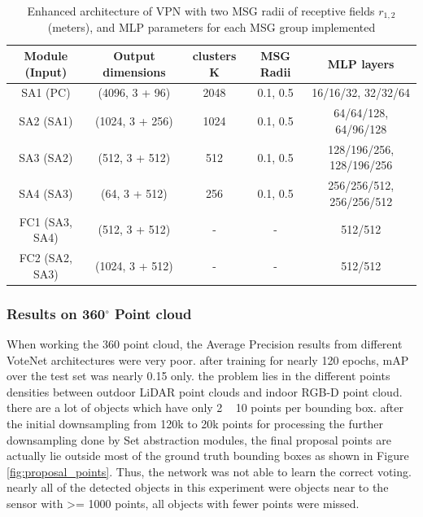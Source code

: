 \documentclass[10pt,twocolumn,letterpaper]{article}
\begin{document}
\begin{table}
\label{tab:votenet_msg}
\begin{center}
\begin{tabular}{|c|c|c|c|c|}
\hline
Module (Input) & Output dimensions & clusters K & MSG Radii & MLP layers \\
\hline\hline
SA1 (PC) & (4096, 3 + 96) & 2048 & 0.1,  0.5 & 16/16/32, 32/32/64 \\
SA2 (SA1) & (1024, 3 + 256) & 1024 & 0.1,  0.5 & 64/64/128,  64/96/128 \\
SA3 (SA2) & (512, 3 + 512) & 512 & 0.1,  0.5 & 128/196/256,  128/196/256 \\
SA4 (SA3) & (64, 3 + 512) & 256 & 0.1,  0.5 & 256/256/512,  256/256/512 \\
FC1 (SA3, SA4) & (512, 3 + 512) & - & - & 512/512 \\
FC2 (SA2, SA3) & (1024, 3 + 512) & - & - & 512/512 \\
\hline
\end{tabular}
\end{center}
\caption{Enhanced architecture of VPN with two MSG radii of receptive fields $r_{1,2}$ (meters), and MLP parameters for each MSG group implemented \cite{shi2019pointrcnn}}
\end{table}

\subsubsection{Results on 360$^{\circ}$ Point cloud}
When working the 360 point cloud, the Average Precision results from different VoteNet architectures were very poor. after training for nearly 120 epochs, mAP over the test set was nearly 0.15 only. the problem lies in the different points densities between outdoor LiDAR point clouds and  indoor RGB-D point cloud. there are a lot of objects which have only 2 ~ 10 points per bounding box. after the initial downsampling from 120k to 20k points for processing the further downsampling done by Set abstraction modules, the final proposal points are actually lie outside most of the ground truth bounding boxes as shown in Figure \ref{fig:proposal_points}. Thus, the network was not able to learn the correct voting. nearly all of the detected objects in this experiment were objects near to the sensor with >= 1000 points, all objects with fewer points were missed.
\end{document}
